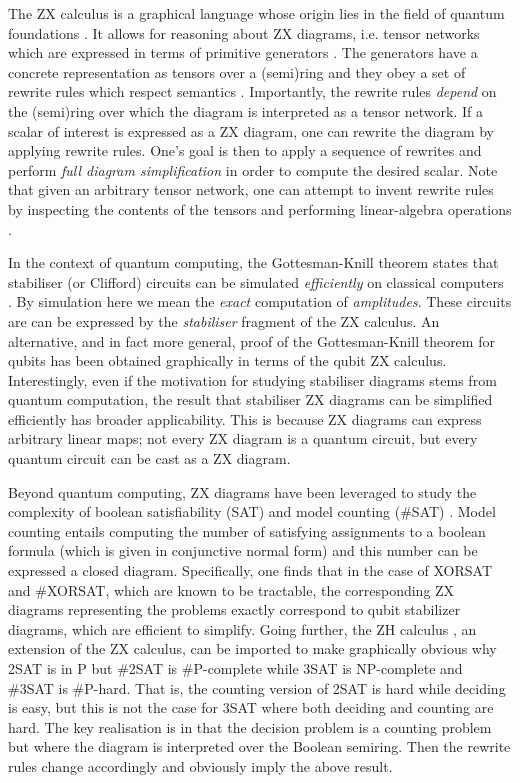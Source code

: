 \documentclass[submission,copyright,creativecommons]{eptcs}
\begin{document}
The ZX calculus is a graphical language whose origin lies in the field of quantum foundations \cite{Coecke2011}.
It allows for reasoning about ZX diagrams, i.e. tensor networks which are expressed in terms of primitive generators \cite{vandewetering2020zxcalculus}.
The generators have a concrete representation as tensors over
a (semi)ring and they obey a set of rewrite rules which respect semantics \cite{wang2020completeness}.
Importantly, the rewrite rules \emph{depend} on the (semi)ring over which the diagram is interpreted as a tensor network.
If a scalar of interest is expressed as a ZX diagram,
one can rewrite the diagram by applying rewrite rules.
One's goal is then to apply a sequence of rewrites and perform \emph{full diagram simplification} in order to compute the desired scalar.
Note that
given an arbitrary tensor network, one can attempt to invent rewrite rules by inspecting the contents of the tensors and performing linear-algebra operations \cite{gray2020hyperoptimized}.

In the context of quantum computing,
the Gottesman-Knill theorem states that stabiliser (or Clifford) circuits can be
simulated \emph{efficiently} on classical computers \cite{Aaronson2004}.
By simulation here we mean the \emph{exact} computation of \emph{amplitudes}.
These circuits are can be expressed by the \emph{stabiliser} fragment of the ZX calculus.
An alternative, and in fact more general, proof of the Gottesman-Knill theorem for qubits has been obtained graphically in terms of the qubit ZX calculus.
Interestingly, even if the motivation for studying stabiliser diagrams stems from quantum computation, the result that stabiliser ZX diagrams can be simplified efficiently has broader applicability. This is because
ZX diagrams can express arbitrary linear maps; not every ZX diagram is a quantum circuit, but every quantum circuit can be cast as a ZX diagram.

Beyond quantum computing, ZX diagrams have been leveraged to study the complexity of boolean satisfiability (SAT) and model counting (\#SAT) \cite{debeaudrap2020tensor}.
Model counting entails computing the number of satisfying assignments to a boolean formula (which is given in conjunctive normal form)
and this number can be expressed a closed diagram.
Specifically, one finds that in the case of XORSAT and \#XORSAT,
which are known to be tractable,
the corresponding ZX diagrams representing the problems exactly correspond to qubit stabilizer diagrams, which are efficient to simplify.
Going further, the ZH calculus \cite{backens2018zh}, an extension of the ZX calculus, can be imported to make graphically obvious
why 2SAT is in P but \#2SAT is \#P-complete while 3SAT is NP-complete and \#3SAT is \#P-hard.
That is, the counting version of 2SAT is hard while deciding is easy, but this is not the case for 3SAT where both deciding and counting are hard.
The key realisation is in that the decision problem is a counting problem
but where the diagram is interpreted over the Boolean semiring.
Then the rewrite rules change accordingly and obviously imply the above result.
\end{document}
